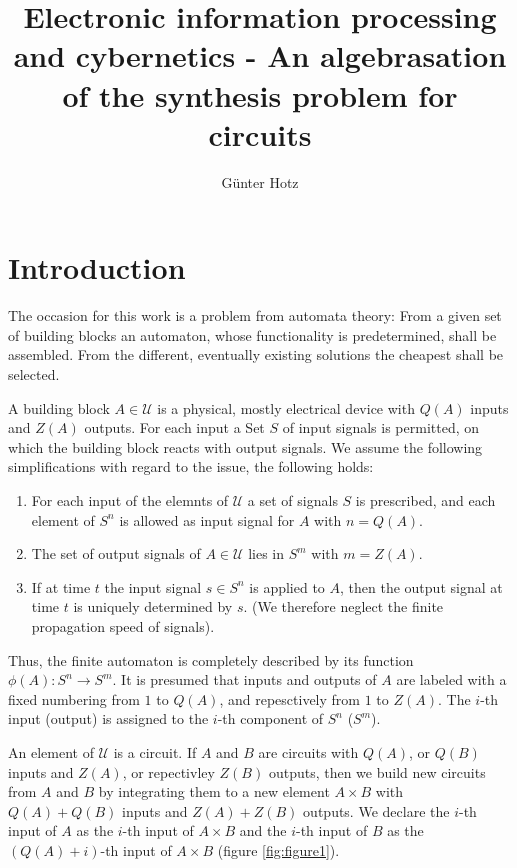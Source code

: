 \documentclass{article}
\begin{document}
\title{Electronic information processing and cybernetics - An algebrasation of the synthesis problem for circuits}
\author{Günter Hotz}
\maketitle

\section{Introduction}
The occasion for this work is a problem from automata theory: From a given set of building blocks an automaton, whose functionality is predetermined, shall be assembled. From the different, eventually existing  solutions the cheapest shall be selected. 

A building block $A \in \mathcal{U}$ is a physical, mostly electrical device with $Q(A)$ inputs and $Z(A)$ outputs. For each input a Set $S$ of input signals is permitted, on which the building block reacts with output signals. We assume the following simplifications with regard to the issue, the following holds:

\begin{enumerate}
\item For each input of the elemnts of $\mathcal{U}$ a set of signals $S$ is prescribed, and each element of $S^n$ is allowed as input signal for $A$ with $n = Q(A)$.
\item The set of output signals of $A \in \mathcal{U}$ lies in $S^m$ with $m = Z(A)$.
\item If at time $t$ the input signal $s \in S^n$ is applied to $A$, then the output signal at time $t$ is uniquely determined by $s$. (We therefore neglect the finite propagation speed of signals).
\end{enumerate}

Thus, the finite automaton is completely described by its function $\phi(A):S^n \rightarrow S^m$. It is presumed that inputs and outputs of $A$ are labeled with a fixed numbering from $1$ to $Q(A)$, and repesctively from $1$ to $Z(A)$. The $i$-th input (output) is assigned to the $i$-th component of $S^n$ ($S^m$). 

An element of $\mathcal{U}$ is a circuit. If $A$ and $B$ are circuits with $Q(A)$, or $Q(B)$ inputs and $Z(A)$, or repectivley $Z(B)$ outputs, then we build new circuits from $A$ and $B$ by integrating them to a new element $A\times B$ with $Q(A)+Q(B)$ inputs and $Z(A)+Z(B)$ outputs. We declare the $i$-th input of $A$ as the $i$-th input of $A\times B$ and the $i$-th input of $B$ as the $(Q(A) + i)$-th input of $A\times B$ (figure \ref{fig:figure1}).
\end{document}
